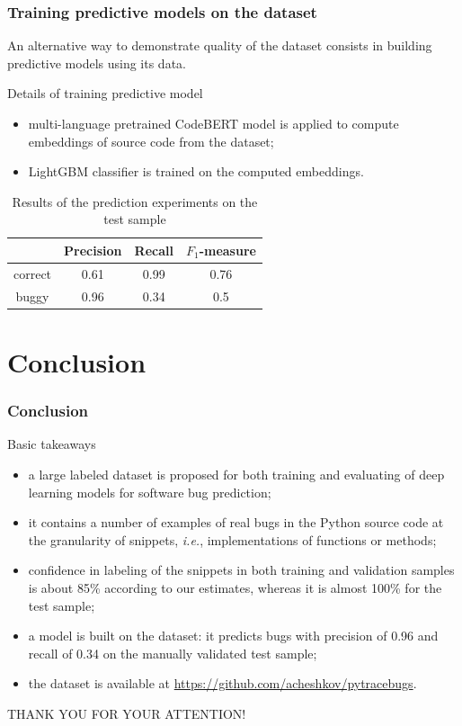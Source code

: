 \documentclass{beamer}
\begin{document}
\begin{frame}
\frametitle{Training predictive models on the dataset}

An alternative way to demonstrate quality of the dataset consists in
building predictive models using its data.

\begin{block}{Details of training predictive model}
\begin{itemize}
\item multi-language pretrained
CodeBERT model is applied to compute embeddings of source code from the dataset;
\item LightGBM classifier is trained on the computed embeddings.
\end{itemize}
\end{block}

{\small
\begin{table}[htbp]
\caption{Results of the prediction experiments on the test sample}
\begin{center}
\renewcommand{\arraystretch}{1.2}
\begin{tabular}{| c | c | c | c |}
\hline
    & Precision & Recall &$F_1$-measure \\
\hline
  correct & 0.61 & 0.99 & 0.76 \\
\hline
  buggy & 0.96 & 0.34 & 0.5 \\
\hline
\end{tabular}
\label{tab8}
\end{center}
\end{table}}

\end{frame}

\section{Conclusion}

\begin{frame}
\frametitle{Conclusion}

{\small
\begin{block}{Basic takeaways}
\begin{itemize}
\item a large labeled dataset is proposed for both training and evaluating of deep learning models
for software bug prediction; 
\item it contains a number of examples of real bugs in the Python source code at the granularity of
snippets, \textit{i.e.}, implementations of functions or methods;
\item confidence in labeling of the snippets in both training and validation samples is about 85\% according to our estimates, whereas it is almost 100\% for the test sample;
\item a model is built on the dataset:
it predicts bugs with precision of 0.96 and recall of 0.34 on the manually validated test sample;
\item the dataset is available at \url{https://github.com/acheshkov/pytracebugs}.
\end{itemize}
\end{block}}

\end{frame}

\begin{frame}

{\Large
\begin{center}
THANK YOU FOR YOUR ATTENTION!
\end{center}}



\end{frame}
\end{document}
